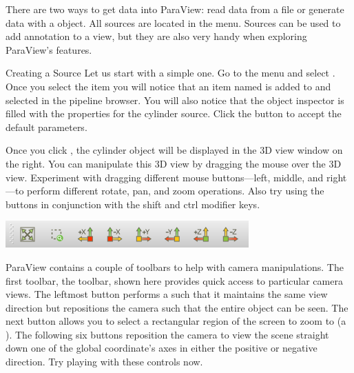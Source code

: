 There are two ways to get data into ParaView: read data from a file or
generate data with a  object.  All sources are located in
the  menu.  Sources can be used to add annotation to a view,
but they are also very handy when exploring ParaView's features.

\begin{exercise}{Creating a Source}
  \label{ex:CreatingASource}%
  Let us start with a simple one.  Go to the  menu and select
  .  Once you select the  item you will notice
  that an item named  is added to and selected in the
  pipeline browser.  You will also notice that the object inspector is
  filled with the properties for the cylinder source.  
  Click the  button \apply to accept the default parameters.

  Once you click , the cylinder object will be displayed in the
  3D view window on the right.  You can manipulate this 3D view by dragging
  the mouse over the 3D view.  Experiment with dragging different mouse
  buttons---left, middle, and right---to perform different rotate, pan, and
  zoom operations.  Also try using the buttons in conjunction with the
  shift and ctrl modifier keys.

  \begin{inlinefig}
    \includegraphics[width=.83\scw]{images/ToolbarCamera}
  \end{inlinefig}


  ParaView contains a couple of toolbars to help with camera manipulations.
  The first toolbar, the  toolbar, shown here provides
  quick access to particular camera views.  The leftmost button
   performs a  such that it
  maintains the same view direction but repositions the camera such that
  the entire object can be seen.  The next button
   allows you to select a rectangular region of
  the screen to zoom to (a ).  The following six
  buttons reposition the camera to view the scene straight down one of the
  global coordinate's axes in either the positive or negative direction.
  Try playing with these controls now.


\end{exercise}
